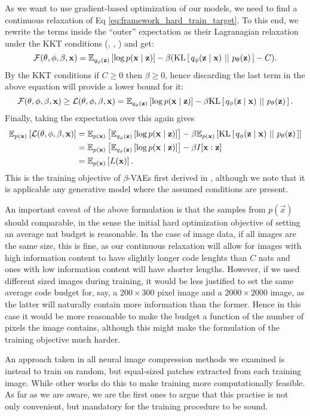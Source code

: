 As we want to use gradient-based optimization of our models, we need to find a
continuous relaxation of Eq \ref{eq:framework_hard_train_target}.
To this end, we rewrite the terms inside the ``outer'' expectation as their
Lagranagian relaxation under the KKT conditions (\cite{karush2014minima},
\cite{kuhn2014nonlinear}, \cite{higgins2017beta}) and get:
\[
  \F(\theta, \phi, \beta, \vec{x}) = 
  \Exp{\log p(\vec{x} \mid \vec{z})}{q_\phi(\vec{z})}
  - \beta (\KL{q_{\phi}(\vec{z} \mid \vec{x})}{p_{\theta}(\vec{z})} - C).
\]
By the KKT conditions if $C \geq 0$ then $\beta \geq 0$, hence discarding the last
term in the above equation will provide a lower bound for it:
\[
  \F(\theta, \phi, \beta, \vec{x}) \geq
  \L(\theta, \phi, \beta, \vec{x}) =
  \Exp{\log p(\vec{x} \mid \vec{z})}{q_\phi(\vec{z})} - \beta
  \KL{q_{\phi}(\vec{z} \mid \vec{x})}{p_{\theta}(\vec{z})}.
\]
Finally, taking the expectation over this again gives
\begin{equation}
\label{eq:framework_train_target}
\begin{aligned}
  \Exp{\L(\theta, \phi, \beta, \vec{x})}{p(\vec{x})} &=
  \Exp{\Exp{\log p(\vec{x} \mid \vec{z})}{q_\phi(\vec{z})}}{p(\vec{x})} - \beta
  \Exp{\KL{q_{\phi}(\vec{z} \mid \vec{x})}{p_{\theta}(\vec{z})}}{p(\vec{x})} \\
  &= \Exp{\Exp{\log p(\vec{x} \mid \vec{z})}{q_\phi(\vec{z})}}{p(\vec{x})} - \beta
  I[ \vec{x} : \vec{z} ] \\
  &= \Exp{L(\vec{x})}{p(\vec{x})}.
\end{aligned}
\end{equation}
This is the training objective of $\beta$-VAEs first derived in
\cite{higgins2017beta}, although we note that it is applicable any generative
model where the assumed conditions are present.
\par
An important caveat of the above formulation is that the samples from
$p(\vec{x})$ should comparable, in the sense the initial hard optimization objective
of setting an average nat budget is reasonable. In the case of image data, if
all images are the same size, this is fine, as our continuous relaxation will
allow for images with high information content to have slightly longer code
lenghts than $C$ nats and ones with low information content will have shorter
lengths. However, if we used different sized images during training, it would be
less justified to set the same average code budget for, say, a $200 \times 300$ pixel
image and a $2000 \times 2000$ image, as the latter will naturally contain more
information than the former. Hence in this case it would be more reasonable
to make the budget a function of the number of pixels the image contains,
although this might make the formulation of the training objective much harder.
\par
An approach taken in all neural image compression methods we examined is instead
to train on random, but equal-sized patches extracted from each training image.
While other works do this to make training more computationally feasible. As
far as we are aware, we are the first ones to argue that this practise is not only
convenient, but mandatory for the training procedure to be sound.

